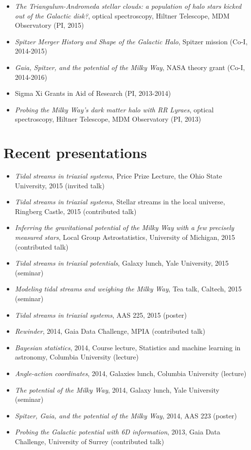 \documentclass[12pt,letterpaper]{article}
\begin{document}
	\begin{itemize}
	\item {\it The Triangulum-Andromeda stellar clouds: a population of halo stars kicked out of the Galactic disk?}, optical spectroscopy, Hiltner Telescope, MDM Observatory (PI, 2015)
	\item {\it Spitzer Merger History and Shape of the Galactic Halo}, Spitzer mission (Co-I, 2014-2015)
	\item {\it Gaia, Spitzer, and the potential of the Milky Way}, NASA theory grant (Co-I, 2014-2016)
	\item Sigma Xi Grants in Aid of Research (PI, 2013-2014)
	\item {\it Probing the Milky Way's dark matter halo with RR Lyraes}, optical spectroscopy, Hiltner Telescope, MDM Observatory (PI, 2013)
	\end{itemize}

\section*{Recent presentations}

\begin{itemize}
	\item \emph{Tidal streams in triaxial systems}, Price Prize Lecture, the Ohio State University, 2015 (invited talk)
	\item \emph{Tidal streams in triaxial systems}, Stellar streams in the local universe, Ringberg Castle, 2015 (contributed talk)
        \item \emph{Inferring the gravitational potential of the Milky Way with a few precisely measured stars}, Local Group Astrostatistics, University of Michigan, 2015 (contributed talk)
        \item \emph{Tidal streams in triaxial potentials}, Galaxy lunch, Yale University, 2015 (seminar)
	\item \emph{Modeling tidal streams and weighing the Milky Way}, Tea talk, Caltech, 2015 (seminar)
	\item \emph{Tidal streams in triaxial systems}, AAS 225, 2015 (poster)
	\item \emph{Rewinder}, 2014, Gaia Data Challenge, MPIA (contributed talk)
	\item \emph{Bayesian statistics}, 2014, Course lecture, Statistics and machine learning in astronomy, Columbia University (lecture)
	\item \emph{Angle-action coordinates}, 2014, Galaxies lunch, Columbia University (lecture)
	\item \emph{The potential of the Milky Way}, 2014, Galaxy lunch, Yale University (seminar)
	\item \emph{Spitzer, Gaia, and the potential of the Milky Way}, 2014, AAS 223 (poster)
	\item \emph{Probing the Galactic potential with 6D information}, 2013, Gaia Data Challenge, University of Surrey (contributed talk)

\end{itemize}
\end{document}
